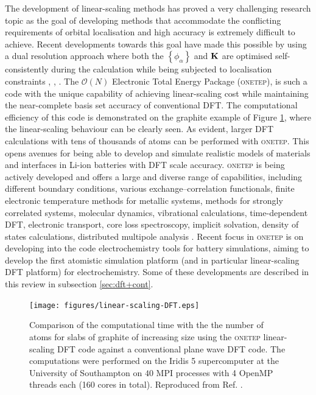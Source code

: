 \documentclass[../main.tex]{subfiles}
\begin{document}
The development of linear-scaling methods has proved a very challenging research topic as the goal of developing methods that accommodate the conflicting requirements of orbital localisation and high accuracy is extremely difficult to achieve. Recent developments towards this goal have made this possible by using a dual resolution approach where both the $\left\{\phi_\alpha\right\}$ and $\bf K$ are optimised self-consistently during the calculation while being subjected to localisation constraints \cite{ONETEP2005}, \cite{Gillan2007}, \cite{Mohr2015}. 
The $\mathcal{O}(N)$ Electronic Total Energy Package (\textsc{onetep}),\cite{ONETEP2020} is such a code with the unique capability of achieving linear-scaling cost while maintaining the near-complete basis set accuracy of conventional DFT. The computational efficiency of this code is demonstrated on the  graphite example of Figure \ref{fig:ls}, where the linear-scaling behaviour can be clearly seen. As evident, larger DFT calculations with tens of thousands of atoms can be performed with \textsc{onetep}. This opens avenues for being able to develop and simulate realistic models of  materials and interfaces in Li-ion batteries with DFT scale accuracy.  \textsc{onetep} is being actively developed and offers a  large and diverse range of capabilities, including different boundary conditions, various exchange–correlation functionals, finite electronic temperature methods for metallic systems, methods for strongly correlated systems, molecular dynamics, vibrational calculations, time-dependent DFT, electronic transport, core loss spectroscopy, implicit solvation, density of states calculations, distributed multipole analysis \cite{ONETEP2020}. Recent focus in \textsc{onetep} is on developing into the code electrochemistry tools for battery simulations, aiming to develop  the first atomistic simulation platform (and in particular linear-scaling DFT platform) for electrochemistry. Some of these developments are described in this review in subsection \ref{sec:dft+cont}.

\begin{figure}
    \centering
    \texttt{[image: figures/linear-scaling-DFT.eps]}
    \caption{Comparison of the computational time with the the number of atoms for slabs of graphite of increasing size using the \textsc{onetep} linear-scaling DFT code against a conventional plane wave DFT code. The computations were performed on the Iridis 5 supercomputer at the University of Southampton on $40$ MPI processes with 4 OpenMP threads each (160 cores in total). Reproduced from Ref. .}
    \label{fig:ls}
\end{figure}
\end{document}
